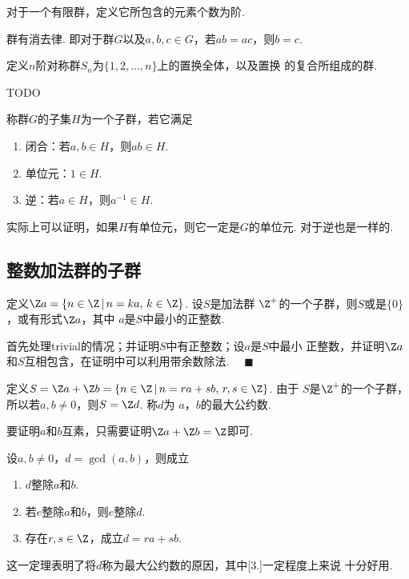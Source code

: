   \begin{defi}[阶]
    对于一个有限群，定义它所包含的元素个数为阶.
  \end{defi}

  \begin{pos}[消去律]
    群有消去律. 即对于群$G$以及$a,b,c\in G$，若$ab=ac$，则$b=c$.
  \end{pos}

  \begin{defi}[对称群]
    定义$n$阶对称群$S_n$为$\{1,2,\dots,n\}$上的置换全体，以及置换
    的复合所组成的群.
  \end{defi}

  \begin{pos}[$2$阶对称群]
    TODO
  \end{pos}

  \begin{defi}[子群]
    称群$G$的子集$H$为一个子群，若它满足
    \begin{enumerate}
      \item 闭合：若$a,b\in H$，则$ab\in H$.
      \item 单位元：$1\in H$.
      \item 逆：若$a\in H$，则$a^{-1}\in H$.
    \end{enumerate}
  \end{defi}
  \remark
    实际上可以证明，如果$H$有单位元，则它一定是$G$的单位元. 对于逆也是一样的.

\subsection{整数加法群的子群}

  \begin{thm}
    定义$\Z a=\{n\in\Z\,|\,n=ka,\,k\in\Z\}$. 设$S$是加法群
    $\Z^+$的一个子群，则$S$或是$\{0\}$，或有形式$\Z a$，其中
    $a$是$S$中最小的正整数.
  \end{thm}
  \proof
    首先处理trivial的情况；并证明$S$中有正整数；设$a$是$S$中最小
    正整数，并证明$\Z a$和$S$互相包含，在证明中可以利用带余数除法.
    $\quad\blacksquare$

  \begin{defi}[最大公约数]
    定义$S=\Z a+\Z b=\{n\in\Z\,|\,n=ra+sb,\,r,s\in\Z\}$. 由于
    $S$是$\Z^+$的一个子群，所以若$a,b\ne 0$，则$S=\Z d$. 称$d$为
    $a$，$b$的最大公约数.
  \end{defi}
  \remark
    要证明$a$和$b$互素，只需要证明$\Z a+\Z b = \Z$即可.

  \begin{thm}[最大公约数]
    设$a,b\ne 0$，$d=\gcd(a, b)$，则成立
    \begin{enumerate}
      \item $d$整除$a$和$b$.
      \item 若$e$整除$a$和$b$，则$e$整除$d$.
      \item 存在$r,s\in\Z$，成立$d=ra+sb$.
    \end{enumerate}
  \end{thm}
  \remark
    这一定理表明了将$d$称为最大公约数的原因，其中[3.]一定程度上来说
    十分好用.

